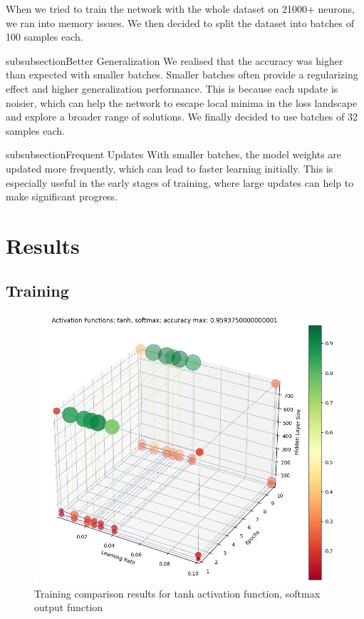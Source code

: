 \documentclass{article}
\begin{document}
When we tried to train the network with the 
whole dataset on 21000+ neurons, 
we ran into memory issues.
We then decided to split the dataset into batches of 100 samples each.

subsubsection{Better Generalization} 
We realised that the accuracy was higher than expected with smaller batches.
Smaller batches often provide a regularizing effect
 and higher generalization performance. 
 This is because each update is noisier, 
 which can help the network to escape 
 local minima in the loss landscape and 
 explore a broader range of solutions.
We finally decided to use batches of 32 samples each.

subsubsection{Frequent Updates} 
With smaller batches, 
the model weights are updated more frequently, 
which can lead to faster learning initially. 
This is especially useful in the early stages of training, 
where large updates can help to make significant progress.


\section{Results}
\subsection{Training}
\begin{figure}
    \centering
    \includegraphics[width=\textwidth]{media/training/results_plot_activation_functions_tanh_softmax_2023-12-29162932.png}
    \caption{Training comparison results for tanh activation function, softmax output function}
    \label{fig:comparison}
\end{figure}
\end{document}
